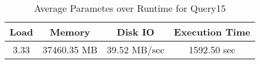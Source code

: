\documentclass[../../main.tex]{subfiles}
\begin{document}
\begin{minipage}{.5\textwidth}
    \end{minipage}
    \begin{table}
        \begin{center}
            \begin{tabular}{ |c|c|c|c| } 
            \hline
            Load & Memory & Disk IO & Execution Time\\
            \hline
            3.33 & 37460.35 MB & 39.52 MB/sec & 1592.50 sec \\
            \hline
            \end{tabular}
            \\[1pt]
            \caption{Average Parametes over Runtime for Query15}
        \end{center}
    \end{table}
    \pagebreak
\end{document}
